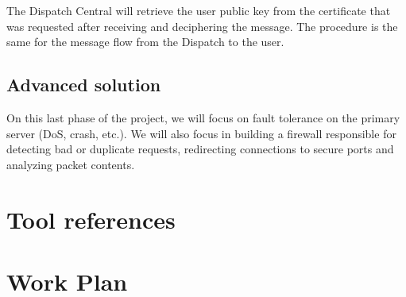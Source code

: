 \documentclass[a4paper,titlepage,11pt]{article}
\begin{document}
The Dispatch Central will retrieve the user public key from the certificate that was requested after receiving and deciphering the message.   %
The procedure is the same for the message flow from the Dispatch to the user.

\subsection{Advanced solution}
On this last phase of the project, we will focus on fault tolerance on the primary server (DoS, crash, etc.).
We will also focus in building a firewall responsible for detecting bad or duplicate requests,
redirecting connections to secure ports and analyzing packet contents.

\section{Tool references}

\section{Work Plan}
\end{document}

